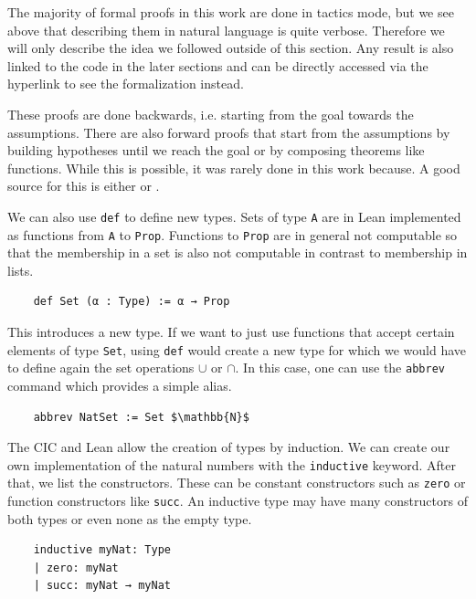 The majority of formal proofs in this work are done in tactics mode, but we see above that describing them in natural language is quite verbose. Therefore we will only describe the idea we followed outside of this section. Any result is also linked to the code in the later sections and can be directly accessed via the hyperlink to see the formalization instead.

These proofs are done backwards, i.e. starting from the goal towards the assumptions. There are also forward proofs that start from the assumptions by building hypotheses until we reach the goal or by composing theorems like functions. While this is possible, it was rarely done in this work because. A good source for this is either \cite{theoremProvingLean} or \cite{HitchhikerLogicVer}.


We can also use \lstinline|def| to define new types. Sets of type \lstinline|A| are in Lean implemented as functions from \lstinline|A| to \lstinline|Prop|. Functions to \lstinline|Prop| are in general not computable so that the membership in a set is also not computable in contrast to membership in lists.

\begin{lstlisting}
    def Set (α : Type) := α → Prop
\end{lstlisting}

This introduces a new type. If we want to just use functions that accept certain elements of type \lstinline|Set|, using \lstinline|def| would create a new type for which we would have to define again the set operations $\cup$ or $\cap$. In this case, one can use the \lstinline|abbrev| command which provides a simple alias.

\begin{lstlisting}
    abbrev NatSet := Set $\mathbb{N}$
\end{lstlisting}

The CIC and Lean allow the creation of types by induction. We can create our own implementation of the natural numbers with the \lstinline|inductive| keyword. After that, we list the constructors. These can be constant constructors such as \lstinline|zero| or function constructors like \lstinline|succ|.
An inductive type may have many constructors of both types or even none as the empty type.

\begin{lstlisting}
    inductive myNat: Type
    | zero: myNat
    | succ: myNat → myNat
\end{lstlisting}

